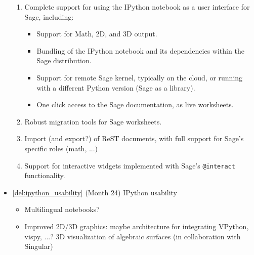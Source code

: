 \begin{Workpackage}{\thewpno}
\begin{WPDeliverables}
\begin{itemize}
    \begin{enumerate}
    \item Complete support for using the IPython notebook as a user
      interface for Sage, including:
      \begin{itemize}
      \item Support for Math, 2D, and 3D output.
      \item Bundling of the IPython notebook and its dependencies within
        the Sage distribution.
      \item Support for remote Sage kernel, typically on the cloud, or
        running with a different Python version (Sage as a library).
      \item One click access to the Sage documentation, as live
        worksheets.
      \end{itemize}
    \item Robust migration tools for Sage worksheets.
    \item Import (and export?)  of ReST documents, with full support for
      Sage's specific roles (math, ...)
    \item Support for interactive widgets implemented with Sage's
      \texttt{@interact} functionality.
    \end{enumerate}
  \item \ref{del:ipython_usability} (Month 24) IPython usability
    \begin{itemize}
    \item Multilingual notebooks?
    \item Improved 2D/3D graphics: maybe architecture for integrating
      VPython, vispy, ...? 3D visualization of algebraic surfaces (in
      collaboration with Singular)

    \end{itemize}


\end{itemize}
\end{WPDeliverables}
\end{Workpackage}
